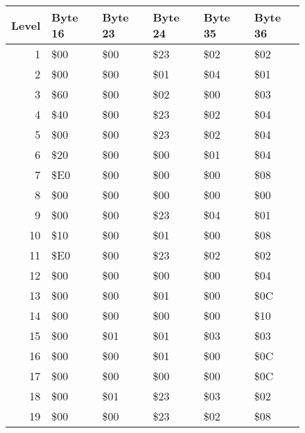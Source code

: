 \begin{figure}[H]
  {
  \setlength{\tabcolsep}{3.0pt}
  \setlength\cmidrulewidth{\heavyrulewidth} %
  \begin{adjustbox}{width=\textwidth}

\begin{tabular}{rlllll}
\toprule
   Level & Byte 16   & Byte 23   & Byte 24   & Byte 35   & Byte 36   \\
\midrule
       1 & \$00       & \$00       & \$23       & \$02       & \$02       \\
       2 & \$00       & \$00       & \$01       & \$04       & \$01       \\
       3 & \$60       & \$00       & \$02       & \$00       & \$03       \\
       4 & \$40       & \$00       & \$23       & \$02       & \$04       \\
       5 & \$00       & \$00       & \$23       & \$02       & \$04       \\
       6 & \$20       & \$00       & \$00       & \$01       & \$04       \\
       7 & \$E0       & \$00       & \$00       & \$00       & \$08       \\
       8 & \$00       & \$00       & \$00       & \$00       & \$00       \\
       9 & \$00       & \$00       & \$23       & \$04       & \$01       \\
      10 & \$10       & \$00       & \$01       & \$00       & \$08       \\
      11 & \$E0       & \$00       & \$23       & \$02       & \$02       \\
      12 & \$00       & \$00       & \$00       & \$00       & \$04       \\
      13 & \$00       & \$00       & \$01       & \$00       & \$0C       \\
      14 & \$00       & \$00       & \$00       & \$00       & \$10       \\
      15 & \$00       & \$01       & \$01       & \$03       & \$03       \\
      16 & \$00       & \$00       & \$01       & \$00       & \$0C       \\
      17 & \$00       & \$00       & \$00       & \$00       & \$0C       \\
      18 & \$00       & \$01       & \$23       & \$03       & \$02       \\
      19 & \$00       & \$00       & \$23       & \$02       & \$08       \\

\end{tabular}
\end{adjustbox}}
\end{figure}
